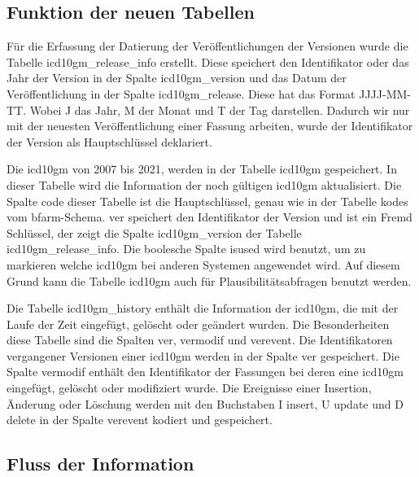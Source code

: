 \subsection{Funktion der neuen Tabellen} \label{newtables}

Für die Erfassung der Datierung der Veröffentlichungen der Versionen wurde die Tabelle \textsf{icd10gm\_release\_info} erstellt. Diese speichert den Identifikator oder das Jahr der Version in der Spalte \textsf{icd10gm\_version} und das Datum der Veröffentlichung in der Spalte \textsf{icd10gm\_release}. Diese hat das Format \textsf{JJJJ-MM-TT}. Wobei J das Jahr, M der Monat und T der Tag darstellen. Dadurch wir nur mit der neuesten Veröffentlichung einer Fassung arbeiten, wurde der Identifikator der Version als Hauptschlüssel deklariert.


Die \ac{icd10gm} von 2007 bis 2021, werden in der Tabelle \textsf{icd10gm} gespeichert. In dieser Tabelle wird die Information der noch gültigen \ac{icd10gm} aktualisiert. Die Spalte \textsf{code} dieser Tabelle ist die Hauptschlüssel, genau wie in der Tabelle \textsf{kodes} vom \ac{bfarm}-Schema. \textsf{ver} speichert den Identifikator der Version und ist ein Fremd Schlüssel, der zeigt die Spalte \textsf{icd10gm\_version} der Tabelle \textsf{icd10gm\_release\_info}. Die boolesche Spalte \textsf{isused} wird benutzt, um zu markieren welche \ac{icd10gm} bei anderen Systemen angewendet wird. Auf diesem Grund kann die Tabelle \textsf{icd10gm} auch für Plausibilitätsabfragen benutzt werden.

Die Tabelle \textsf{icd10gm\_history} enthält die Information der \ac{icd10gm}, die mit der Laufe der Zeit eingefügt, gelöscht oder geändert wurden. Die Besonderheiten diese Tabelle sind die Spalten \textsf{ver}, \textsf{vermodif} und \textsf{verevent}. Die Identifikatoren vergangener Versionen einer \ac{icd10gm} werden in der Spalte \textsf{ver} gespeichert. Die Spalte \textsf{vermodif} enthält den Identifikator der Fassungen bei deren eine \ac{icd10gm} eingefügt, gelöscht oder modifiziert wurde. Die Ereignisse einer Insertion, Änderung oder Löschung werden mit den Buchstaben \textsf{I} \glqq\textsf{insert}\grqq{}, \textsf{U} \glqq\textsf{update}\grqq{} und \textsf{D} \glqq\textsf{delete}\grqq{} in der Spalte \textsf{verevent} kodiert und gespeichert.

\subsection{Fluss der Information} \label{dbrun}

